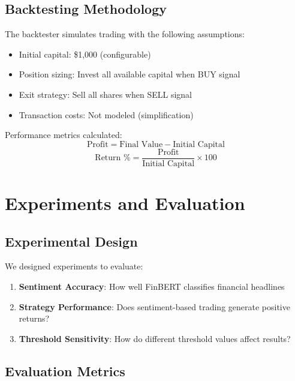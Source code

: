 \documentclass[12pt]{article}
\begin{document}
\subsection{Backtesting Methodology}

The backtester simulates trading with the following assumptions:
\begin{itemize}
\item Initial capital: \$1,000 (configurable)
\item Position sizing: Invest all available capital when BUY signal
\item Exit strategy: Sell all shares when SELL signal
\item Transaction costs: Not modeled (simplification)
\end{itemize}

Performance metrics calculated:
\begin{equation}
\text{Profit} = \text{Final Value} - \text{Initial Capital}
\end{equation}
\begin{equation}
\text{Return \%} = \frac{\text{Profit}}{\text{Initial Capital}} \times 100
\end{equation}

\section{Experiments and Evaluation}

\subsection{Experimental Design}

We designed experiments to evaluate:
\begin{enumerate}
\item \textbf{Sentiment Accuracy}: How well FinBERT classifies financial headlines
\item \textbf{Strategy Performance}: Does sentiment-based trading generate positive returns?
\item \textbf{Threshold Sensitivity}: How do different threshold values affect results?
\end{enumerate}

\subsection{Evaluation Metrics}
\end{document}

